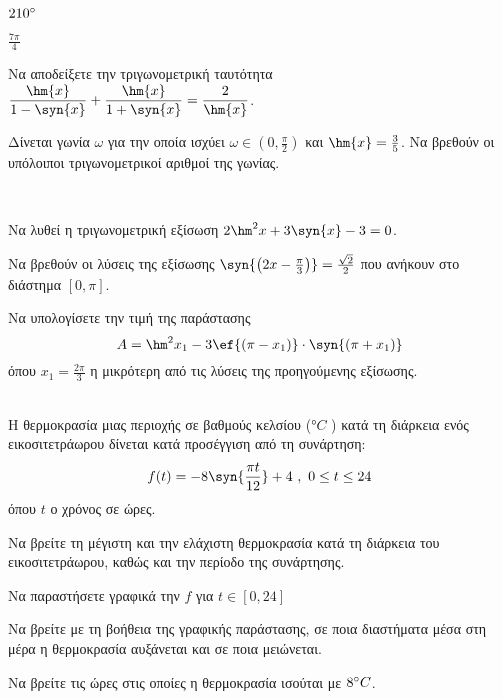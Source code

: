 \documentclass[11pt,a4paper]{article}
\begin{document}
\begin{thema}
\begin{erwthma}
\begin{multicols}{2}
\begin{alist}
\item $210\degree$
\item $\frac{7\pi}{4}$
\end{alist}
\end{multicols}
\item Να αποδείξετε την τριγωνομετρική ταυτότητα $\dfrac{\hm{x}}{1-\syn{x}}+\dfrac{\hm{x}}{1+\syn{x}}=\dfrac{2}{\hm{x}}$.
\item Δίνεται γωνία $\omega$ για την οποία ισχύει $\omega\in\left(0,\frac{\pi}{2}\right)$ και $\hm{x}=\frac{3}{5}$. Να βρεθούν οι υπόλοιποι τριγωνομετρικοί αριθμοί της γωνίας.
\end{erwthma}
\item\mbox{}\\\vspace{-5mm}
\begin{erwthma}
\item Να λυθεί η τριγωνομετρική εξίσωση $2\hm^2{x}+3\syn{x}-3=0$.
\item Να βρεθούν οι λύσεις της εξίσωσης $ \syn{\left(2x-\frac{\pi}{3}\right)}=\frac{\sqrt{2}}{2} $ που ανήκουν στο διάστημα $[0,\pi]$.
\item Να υπολογίσετε την τιμή της παράστασης
\[ A=\hm^2{x_1}-3\ef{(\pi-x_1)}\cdot\syn{(\pi+x_1)} \]
όπου $x_1=\frac{2\pi}{3}$ η μικρότερη από τις λύσεις της προηγούμενης εξίσωσης.
\end{erwthma}
\item\mbox{}\\Η θερμοκρασία μιας περιοχής σε βαθμούς κελσίου (°$C$ ) κατά τη διάρκεια ενός εικοσιτετράωρου δίνεται κατά προσέγγιση από τη συνάρτηση:
\[ f(t)=-8\syn{\frac{\pi t}{12}}+4\ ,\ 0\leq t\leq 24 \]
όπου $t$ ο χρόνος σε ώρες.
\begin{erwthma}
\item Να βρείτε τη μέγιστη και την ελάχιστη θερμοκρασία κατά τη διάρκεια του εικοσιτετράωρου, καθώς και την περίοδο της συνάρτησης.
\item Να παραστήσετε γραφικά την $f$ για $t\in[0,24]$
\item Να βρείτε με τη βοήθεια της γραφικής παράστασης, σε ποια διαστήματα μέσα στη μέρα η θερμοκρασία
αυξάνεται και σε ποια μειώνεται.
\item Να βρείτε τις ώρες στις οποίες η θερμοκρασία ισούται με $ 8\degree C $.
\end{erwthma}
\end{thema}
\end{document}
